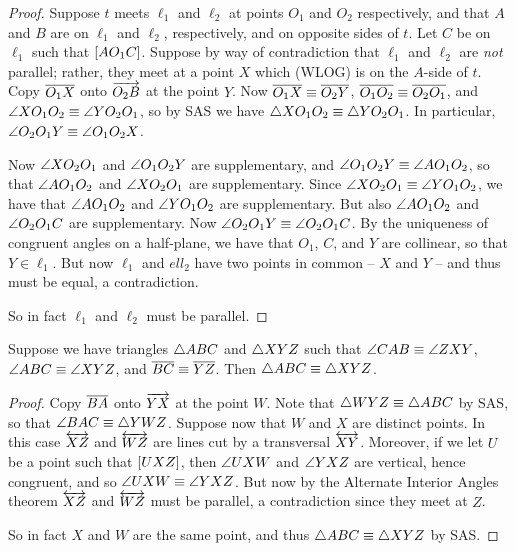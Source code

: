 \begin{proof}
Suppose $t$ meets $\ell_1$ and $\ell_2$ at points $O_1$ and $O_2$ respectively, and that $A$ and $B$ are on $\ell_1$ and $\ell_2$, respectively, and on opposite sides of $t$. Let $C$ be on $\ell_1$ such that $[ A O_1 C ]$. Suppose by way of contradiction that $\ell_1$ and $\ell_2$ are \emph{not} parallel; rather, they meet at a point $X$ which (WLOG) is on the $A$-side of $t$. Copy $\overline{O_1X}$ onto $\overrightarrow{O_2B}$ at the point $Y$. Now $\overline{O_1X} \equiv \overline{O_2Y}$, $\overline{O_1O_2} \equiv \overline{O_2O_1}$, and $\angle{XO_1O_2} \equiv \angle{YO_2O_1}$, so by SAS we have $\bigtriangleup{XO_1O_2} \equiv \bigtriangleup{YO_2O_1}$. In particular, $\angle{O_2O_1Y} \equiv \angle{O_1O_2X}$.

Now $\angle{XO_2O_1}$ and $\angle{O_1O_2Y}$ are supplementary, and $\angle{O_1O_2Y} \equiv \angle{AO_1O_2}$, so that $\angle{AO_1O_2}$ and $\angle{XO_2O_1}$ are supplementary. Since $\angle{XO_2O_1} \equiv \angle{YO_1O_2}$, we have that $\angle{AO_1O_2}$ and $\angle{YO_1O_2}$ are supplementary. But also $\angle{AO_1O_2}$ and $\angle{O_2O_1C}$ are supplementary. Now $\angle{O_2O_1Y} \equiv \angle{O_2O_1C}$. By the uniqueness of congruent angles on a half-plane, we have that $O_1$, $C$, and $Y$ are collinear, so that $Y \in \ell_1$. But now $\ell_1$ and $ell_2$ have two points in common -- $X$ and $Y$ -- and thus must be equal, a contradiction.

So in fact $\ell_1$ and $\ell_2$ must be parallel.  
\end{proof}

\begin{prop}[AAS]
Suppose we have triangles $\bigtriangleup{ABC}$ and $\bigtriangleup{XYZ}$ such that $\angle{CAB} \equiv \angle{ZXY}$, $\angle{ABC} \equiv \angle{XYZ}$, and $\overline{BC} \equiv \overline{YZ}$. Then $\bigtriangleup{ABC} \equiv \bigtriangleup{XYZ}$.
\end{prop}

\begin{proof}
Copy $\overline{BA}$ onto $\overrightarrow{YX}$ at the point $W$. Note that $\bigtriangleup{WYZ} \equiv \bigtriangleup{ABC}$ by SAS, so that $\angle{BAC} \equiv \bigtriangleup{YWZ}$. Suppose now that $W$ and $X$ are distinct points. In this case $\overleftrightarrow{XZ}$ and $\overleftrightarrow{WZ}$ are lines cut by a transversal $\overleftrightarrow{XY}$. Moreover, if we let $U$ be a point such that $[ U X Z ]$, then $\angle{UXW}$ and $\angle{YXZ}$ are vertical, hence congruent, and so $\angle{UXW} \equiv \angle{YXZ}$. But now by the Alternate Interior Angles theorem $\overleftrightarrow{XZ}$ and $\overleftrightarrow{WZ}$ must be parallel, a contradiction since they meet at $Z$.

So in fact $X$ and $W$ are the same point, and thus $\bigtriangleup{ABC} \equiv \bigtriangleup{XYZ}$ by SAS.
\end{proof}

